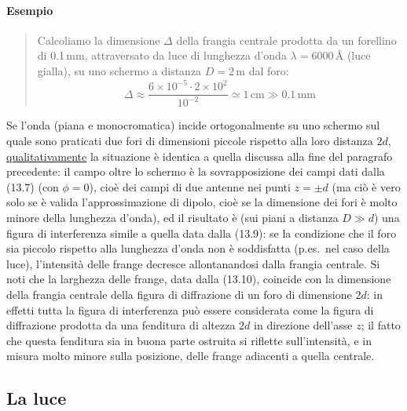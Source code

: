 \paragraph{Esempio}
\begin{quote}
  Calcoliamo la dimensione $\Delta$ della frangia centrale prodotta da un
  forellino di 0.1\,mm, attraversato da luce di lunghezza d'onda
  $\lambda=6000$\,\AA{} (luce gialla), su uno schermo a distanza $D=2$\,m dal
  foro:
  \begin{equation}
    \Delta\approx\frac{6\times10^{-5}\cdot2\times10^2}{10^{-2}}
    \simeq1\,\mathrm{cm}\gg0.1\,\mathrm{mm}
    \tag{13.15}
  \end{equation}
\end{quote}
Se l'onda (piana e monocromatica) incide ortogonalmente su uno schermo sul quale
sono praticati due fori di dimensioni piccole rispetto alla loro distanza $2d$,
\underline{qualitativamente} la situazione \`e identica a quella discussa alla
fine del paragrafo precedente: il campo oltre lo schermo \`e la sovrapposizione
dei campi dati dalla (13.7) (con $\phi=0$), cio\`e dei campi di due antenne nei
punti $z=\pm d$ (ma ci\`o \`e vero solo se \`e valida l'approssimazione di
dipolo, cio\`e se la dimensione dei fori \`e molto minore della lunghezza
d'onda), ed il risultato \`e (sui piani a distanza $D\gg d$) una figura di
interferenza simile a quella data dalla (13.9): se la condizione che il foro sia
piccolo rispetto alla lunghezza d'onda non \`e soddisfatta (p.es.\ nel caso
della luce), l'intensit\`a delle frange decresce allontanandosi dalla frangia
centrale. Si noti che la larghezza delle frange, data dalla (13.10), coincide
con la dimensione della frangia centrale della figura di diffrazione di un foro
di dimensione $2d$: in effetti tutta la figura di interferenza pu\`o essere
considerata come la figura di diffrazione prodotta da una fenditura di altezza
$2d$ in direzione dell'asse $z$; il fatto che questa fenditura sia in buona
parte ostruita si riflette sull'intensit\`a, e in misura molto minore sulla
posizione, delle frange adiacenti a quella centrale.

\subsection{La luce}

